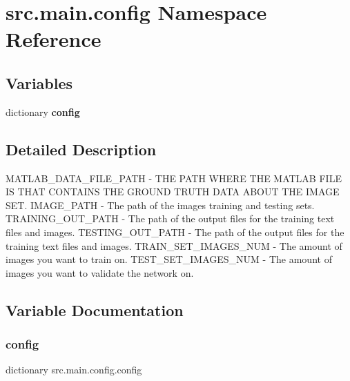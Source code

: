 \hypertarget{namespacesrc_1_1main_1_1config}{}\section{src.\+main.\+config Namespace Reference}
\label{namespacesrc_1_1main_1_1config}
\subsection*{Variables}
\begin{DoxyCompactItemize}
\item 
dictionary {\bfseries config}
\end{DoxyCompactItemize}


\subsection{Detailed Description}
\begin{DoxyVerb}MATLAB_DATA_FILE_PATH - THE PATH WHERE THE MATLAB FILE IS THAT CONTAINS THE GROUND TRUTH DATA ABOUT THE IMAGE SET.
IMAGE_PATH - The path of the images training and testing sets.
TRAINING_OUT_PATH - The path of the output files for the training text files and images.
TESTING_OUT_PATH - The path of the output files for the training text files and images.
TRAIN_SET_IMAGES_NUM - The amount of images you want to train on.
TEST_SET_IMAGES_NUM - The amount of images you want to validate the network on.\end{DoxyVerb}
 

\subsection{Variable Documentation}
\mbox{\label{namespacesrc_1_1main_1_1config_a8159a975f6fc44b086900923821c9b43}} 
\subsubsection{\texorpdfstring{config}{config}}
{\footnotesize\ttfamily dictionary src.\+main.\+config.\+config}

